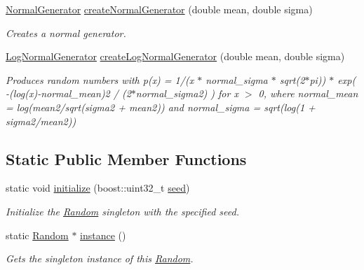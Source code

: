 \begin{DoxyCompactItemize}
\hyperlink{classrepast_1_1_default_number_generator}{Normal\-Generator} \hyperlink{classrepast_1_1_random_a33226e423e66a9fcd3e3cdf3c9ce62ae}{create\-Normal\-Generator} (double mean, double sigma)
\begin{DoxyCompactList}\small\item\em Creates a normal generator. \end{DoxyCompactList}\item 
\hypertarget{classrepast_1_1_random_aff15cda637d1579444379195681aa5d4}{\hyperlink{classrepast_1_1_default_number_generator}{Log\-Normal\-Generator} \hyperlink{classrepast_1_1_random_aff15cda637d1579444379195681aa5d4}{create\-Log\-Normal\-Generator} (double mean, double sigma)}\label{classrepast_1_1_random_aff15cda637d1579444379195681aa5d4}

\begin{DoxyCompactList}\small\item\em Produces random numbers with p(x) = 1/(x $\ast$ normal\-\_\-sigma $\ast$ sqrt(2$\ast$pi)) $\ast$ exp( -\/(log(x)-\/normal\-\_\-mean)2 / (2$\ast$normal\-\_\-sigma2) ) for x $>$ 0, where normal\-\_\-mean = log(mean2/sqrt(sigma2 + mean2)) and normal\-\_\-sigma = sqrt(log(1 + sigma2/mean2)) \end{DoxyCompactList}\end{DoxyCompactItemize}
\subsection*{Static Public Member Functions}
\begin{DoxyCompactItemize}
\item 
static void \hyperlink{classrepast_1_1_random_aff5e636ed06991e91b149e880944022e}{initialize} (boost\-::uint32\-\_\-t \hyperlink{classrepast_1_1_random_abc9590ab2bbd9a61bc1af7c1f72bb604}{seed})
\begin{DoxyCompactList}\small\item\em Initialize the \hyperlink{classrepast_1_1_random}{Random} singleton with the specified seed. \end{DoxyCompactList}\item 
\hypertarget{classrepast_1_1_random_abd9ca1f149eda9adf01c48174caa6734}{static \hyperlink{classrepast_1_1_random}{Random} $\ast$ \hyperlink{classrepast_1_1_random_abd9ca1f149eda9adf01c48174caa6734}{instance} ()}\label{classrepast_1_1_random_abd9ca1f149eda9adf01c48174caa6734}

\begin{DoxyCompactList}\small\item\em Gets the singleton instance of this \hyperlink{classrepast_1_1_random}{Random}. \end{DoxyCompactList}\end{DoxyCompactItemize}
